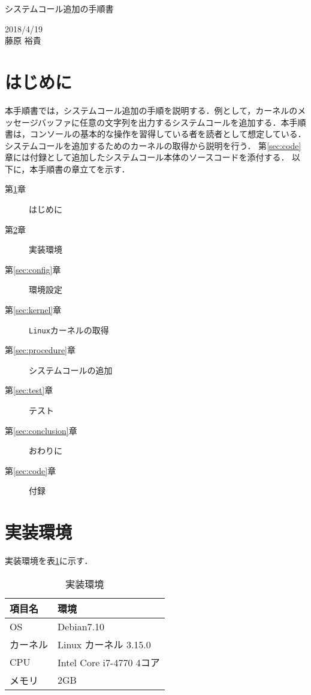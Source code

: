 \documentclass[12pt]{jsarticle}
\begin{document}
\begin{center}
{\LARGE システムコール追加の手順書}
\end{center}

\begin{flushright}
  2018/4/19 \\
 藤原 裕貴
\end{flushright}
\section{はじめに}\label{sec:introduction}
本手順書では，システムコール追加の手順を説明する．例として，カーネルのメッセージバッファに任意の文字列を出力するシステムコールを追加する．本手順書は，コンソールの基本的な操作を習得している者を読者として想定している．システムコールを追加するためのカーネルの取得から説明を行う．
第\ref{sec:code}章には付録として追加したシステムコール本体のソースコードを添付する．
以下に，本手順書の章立てを示す．

\begin{description}
\item [第\ref{sec:introduction}章] はじめに
\item [第\ref{sec:env}章] 実装環境
\item [第\ref{sec:config}章] 環境設定
\item [第\ref{sec:kernel}章] \verb|Linux|カーネルの取得
\item [第\ref{sec:procedure}章] システムコールの追加
\item [第\ref{sec:test}章] テスト
\item [第\ref{sec:conclusion}章] おわりに
\item [第\ref{sec:code}章] 付録


\end{description}

\section{実装環境}\label{sec:env}
実装環境を表\ref{tab:env}に示す．

\begin{table}[h]
  \begin{center}
    \caption{実装環境}\label{tab:env}
    \begin{tabular}{l|l}
      \hline\hline
      \multicolumn{1}{l|}{項目名} & \multicolumn{1}{l}{環境} \\
      \hline
      OS & Debian7.10 \\
      カーネル & Linux カーネル 3.15.0 \\
      CPU & Intel Core i7-4770 4コア\\
      メモリ & 2GB \\
      \hline
    \end{tabular}
  \end{center}
\end{table}
\end{document}

